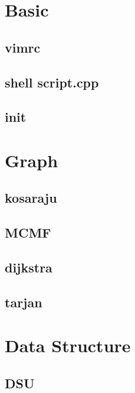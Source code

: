 \documentclass[a4paper,10pt,twocolumn,oneside]{article}
\begin{document}
\pagestyle{fancy}
\fancyfoot{}
\fancyhead[R]{\thepage}
\renewcommand{\headrulewidth}{0.4pt}
\renewcommand{\contentsname}{Contents}

\scriptsize
\tableofcontents

\section{Basic}
\subsection{vimrc}

\subsection{shell script.cpp}

\subsection{init}


\section{Graph}
\subsection{kosaraju}

\subsection{MCMF}

\subsection{dijkstra}

\subsection{tarjan}


\section{Data Structure}
\subsection{DSU}

\end{document}
